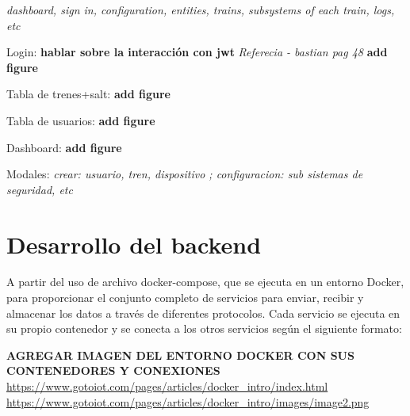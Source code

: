 \textit{dashboard, sign in, configuration, entities, trains, subsystems of each train, logs, etc}

Login: \textbf{hablar sobre la interacción con jwt} \textit{Referecia - bastian pag 48} \textbf{add figure}

Tabla de trenes+salt: \textbf{add figure}

Tabla de usuarios: \textbf{add figure}

Dashboard: \textbf{add figure}

Modales: \textit{crear: usuario, tren, dispositivo ; configuracion: sub sistemas de seguridad, etc}




\newpage
\section{Desarrollo del backend}


A partir del uso de archivo docker-compose, que se ejecuta en un entorno Docker, para proporcionar el conjunto completo de servicios para enviar, recibir y almacenar los datos a través de diferentes protocolos. Cada servicio se ejecuta en su propio contenedor y se conecta a los otros servicios según el siguiente formato:


\textbf{AGREGAR IMAGEN DEL ENTORNO DOCKER CON SUS CONTENEDORES Y CONEXIONES }
\url{https://www.gotoiot.com/pages/articles/docker_intro/index.html}
\url{https://www.gotoiot.com/pages/articles/docker_intro/images/image2.png}


